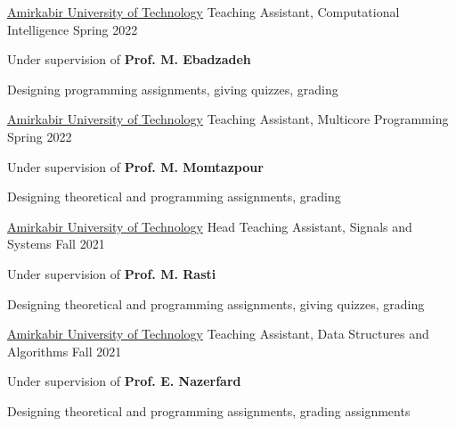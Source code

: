 \begin{cventries}

  \cventry
    {\href{https://aut.ac.ir/}{Amirkabir University of Technology}} %
    {Teaching Assistant, Computational Intelligence} %
    {} %
    {Spring 2022} %
    {
      \begin{cvitems} %
        \item {Under supervision of \textbf{Prof. M. Ebadzadeh}}
        \item {Designing programming assignments, giving quizzes, grading}
      \end{cvitems}
    }
   
  \cventry
    {\href{https://aut.ac.ir/}{Amirkabir University of Technology}} %
    {Teaching Assistant, Multicore Programming} %
    {} %
    {Spring 2022} %
    {
      \begin{cvitems} %
        \item {Under supervision of \textbf{Prof. M. Momtazpour}}
        \item {Designing theoretical and programming assignments, grading}
      \end{cvitems}
    }
    
  \cventry
    {\href{https://aut.ac.ir/}{Amirkabir University of Technology}} %
    {Head Teaching Assistant, Signals and Systems} %
    {} %
    {Fall 2021} %
    {
      \begin{cvitems} %
        \item {Under supervision of \textbf{Prof. M. Rasti}}
        \item {Designing theoretical and programming assignments, giving quizzes, grading}
      \end{cvitems}
    }
   
  \cventry
    {\href{https://aut.ac.ir/}{Amirkabir University of Technology}} %
    {Teaching Assistant, Data Structures and Algorithms} %
    {} %
    {Fall 2021} %
    {
      \begin{cvitems} %
        \item {Under supervision of \textbf{Prof. E. Nazerfard}}
        \item {Designing theoretical and programming assignments, grading assignments}
      \end{cvitems}
    }


\end{cventries}
